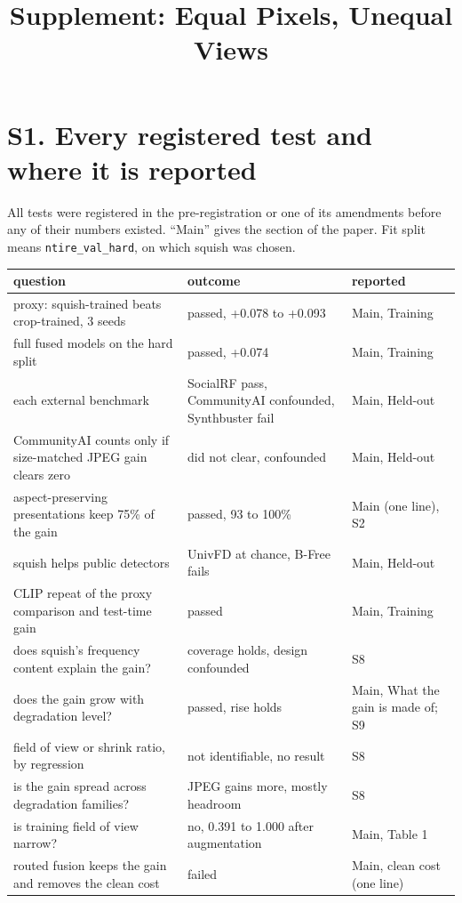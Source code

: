 \documentclass[10pt]{article}
\title{Supplement: Equal Pixels, Unequal Views}
\date{}
\begin{document}
\maketitle

\section*{S1. Every registered test and where it is reported}

All tests were registered in the pre-registration or one of its amendments
before any of their numbers existed. ``Main'' gives the section of the paper.
Fit split means \texttt{ntire\_val\_hard}, on which squish was chosen.

\begin{center}
\small
\begin{tabular}{p{6.0cm}p{4.6cm}p{3.4cm}}
\toprule
question & outcome & reported \\
\midrule
proxy: squish-trained beats crop-trained, 3 seeds & passed, +0.078 to +0.093 & Main, Training \\
full fused models on the hard split & passed, +0.074 & Main, Training \\
each external benchmark & SocialRF pass, CommunityAI confounded, Synthbuster fail & Main, Held-out \\
CommunityAI counts only if size-matched JPEG gain clears zero & did not clear, confounded & Main, Held-out \\
aspect-preserving presentations keep 75\% of the gain & passed, 93 to 100\% & Main (one line), S2 \\
squish helps public detectors & UnivFD at chance, B-Free fails & Main, Held-out \\
CLIP repeat of the proxy comparison and test-time gain & passed & Main, Training \\
does squish's frequency content explain the gain? & coverage holds, design confounded & S8 \\
does the gain grow with degradation level? & passed, rise holds & Main, What the gain is made of; S9 \\
field of view or shrink ratio, by regression & not identifiable, no result & S8 \\
is the gain spread across degradation families? & JPEG gains more, mostly headroom & S8 \\
is training field of view narrow? & no, 0.391 to 1.000 after augmentation & Main, Table 1 \\
routed fusion keeps the gain and removes the clean cost & failed & Main, clean cost (one line) \\

\end{tabular}
\end{center}
\end{document}
